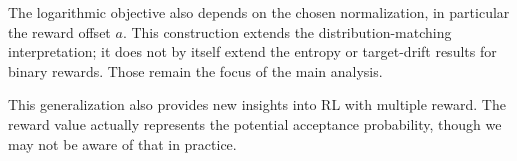 The logarithmic objective also depends on the chosen normalization,
in particular the reward offset $a$. This construction extends the
distribution-matching interpretation; it does not by itself extend
the entropy or target-drift results for binary rewards. Those remain
the focus of the main analysis.

\begin{takeaway}
  This generalization also provides new insights into RL with multiple reward. The reward value actually represents the potential acceptance probability, though we may not be aware of that in practice.
\end{takeaway}
